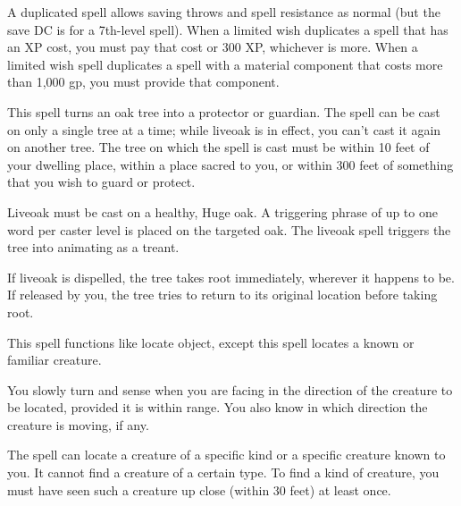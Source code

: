 \begin{multicols}{2}
\begin{small}
\smallskip\noindent A duplicated spell allows saving throws and spell resistance as normal (but the save DC is for a 7th-level spell). When a limited wish duplicates a spell that has an XP cost, you must pay that cost or 300 XP, whichever is more. When a limited wish spell duplicates a spell with a material component that costs more than 1,000 gp, you must provide that component.


\noindent This spell turns an oak tree into a protector or guardian. The spell can be cast on only a single tree at a time; while liveoak is in effect, you can't cast it again on another tree. The tree on which the spell is cast must be within 10 feet of your dwelling place, within a place sacred to you, or within 300 feet of something that you wish to guard or protect.

\smallskip\noindent Liveoak must be cast on a healthy, Huge oak. A triggering phrase of up to one word per caster level is placed on the targeted oak. The liveoak spell triggers the tree into animating as a treant. 

\smallskip\noindent If liveoak is dispelled, the tree takes root immediately, wherever it happens to be. If released by you, the tree tries to return to its original location before taking root.

\noindent This spell functions like locate object, except this spell locates a known or familiar creature.

\smallskip\noindent You slowly turn and sense when you are facing in the direction of the creature to be located, provided it is within range. You also know in which direction the creature is moving, if any.

\smallskip\noindent The spell can locate a creature of a specific kind or a specific creature known to you. It cannot find a creature of a certain type. To find a kind of creature, you must have seen such a creature up close (within 30 feet) at least once.


\end{small}
\end{multicols}
